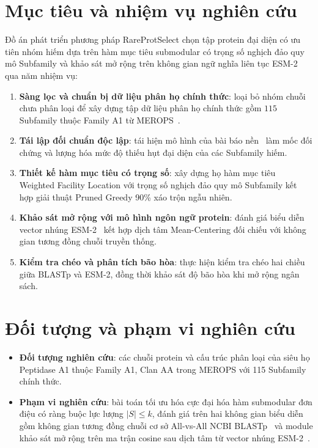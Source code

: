 \section*{Mục tiêu và nhiệm vụ nghiên cứu}
Đồ án phát triển phương pháp RareProtSelect chọn tập protein đại diện có ưu tiên nhóm hiếm dựa trên hàm mục tiêu submodular có trọng số nghịch đảo quy mô Subfamily và khảo sát mở rộng trên không gian ngữ nghĩa liên tục ESM-2~\cite{esm2} qua năm nhiệm vụ:
\begin{enumerate}[noitemsep,topsep=1pt,partopsep=0pt,parsep=0pt]
    \item \textbf{Sàng lọc và chuẩn bị dữ liệu phân họ chính thức}: loại bỏ nhóm chuỗi chưa phân loại để xây dựng tập dữ liệu phân họ chính thức gồm $115$ Subfamily thuộc Family A1 từ MEROPS~\cite{merops}.
    \item \textbf{Tái lập đối chuẩn độc lập}: tái hiện mô hình của bài báo nền~\cite{nguyen2025} làm mốc đối chứng và lượng hóa mức độ thiếu hụt đại diện của các Subfamily hiếm.
    \item \textbf{Thiết kế hàm mục tiêu có trọng số}: xây dựng họ hàm mục tiêu Weighted Facility Location với trọng số nghịch đảo quy mô Subfamily kết hợp giải thuật Pruned Greedy 90\% xáo trộn ngẫu nhiên.
    \item \textbf{Khảo sát mở rộng với mô hình ngôn ngữ protein}: đánh giá biểu diễn vector nhúng ESM-2~\cite{esm2} kết hợp dịch tâm Mean-Centering đối chiếu với không gian tương đồng chuỗi truyền thống.
    \item \textbf{Kiểm tra chéo và phân tích bão hòa}: thực hiện kiểm tra chéo hai chiều giữa BLASTp và ESM-2, đồng thời khảo sát độ bão hòa khi mở rộng ngân sách.
\end{enumerate}

\section*{Đối tượng và phạm vi nghiên cứu}
\begin{itemize}[noitemsep,topsep=1pt,partopsep=0pt,parsep=0pt]
    \item \textbf{Đối tượng nghiên cứu}: các chuỗi protein và cấu trúc phân loại của siêu họ Peptidase A1 thuộc Family A1, Clan AA trong MEROPS với 115 Subfamily chính thức.
    \item \textbf{Phạm vi nghiên cứu}: bài toán tối ưu hóa cực đại hóa hàm submodular đơn điệu có ràng buộc lực lượng $|S| \le k$, đánh giá trên hai không gian biểu diễn gồm không gian tương đồng chuỗi cơ sở All-vs-All NCBI BLASTp~\cite{blast} và module khảo sát mở rộng trên ma trận cosine sau dịch tâm từ vector nhúng ESM-2~\cite{esm2}.
\end{itemize}

